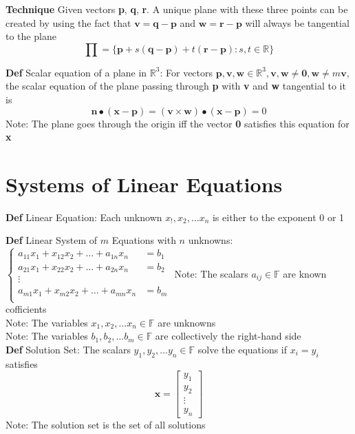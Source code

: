 \documentclass[11pt,notitlepage]{report}
\newcommand{\bb}[1]{\ensuremath{\mathbb{#1}}}
\newcommand{\tbf}[1]{\textbf{#1}}
\begin{document}
\textbf{Technique} Given vectors \tbf p, \tbf q, \tbf r. A unique plane with these three points can be created by using the fact that $\tbf v = \tbf q - \tbf p$ and $\tbf w = \tbf r - \tbf p$ will always be tangential to the plane
$$\prod = \{\tbf p + s(\tbf q - \tbf p) + t(\tbf r - \tbf p): s, t \in \bb R\}$$

\textbf{Def} Scalar equation of a plane in $\bb R^3$: For vectors $\tbf p, \tbf v, \tbf w \in \bb R^3, \tbf v, \tbf w \ne \tbf 0, \tbf w \ne m\tbf v$, the scalar equation of the plane passing through \tbf p with \tbf v and \tbf w tangential to it is
$$\tbf n \bullet (\tbf x - \tbf p) = (\tbf v \times \tbf w) \bullet (\tbf x - \tbf p) = 0$$
\hspace*{5mm} Note: The plane goes through the origin iff the vector \tbf 0 satisfies this equation for \tbf x


\section{Systems of Linear Equations}

\textbf{Def} Linear Equation: Each unknown $x_!, x_2, \dots x_n$ is either to the exponent 0 or 1

\textbf{Def} Linear System of $m$ Equations with $n$ unknowns: 
$\begin{cases}
a_{11}x_1 + x_{12}x_2 + \dots + a_{1n}x_n &= b_1\\
a_{21}x_1 + x_{22}x_2 + \dots + a_{2n}x_n &= b_2\\
\vdots\\
a_{m1}x_1 + x_{m2}x_2 + \dots + a_{mn}x_n &= b_m\\
\end{cases}$
\hspace*{5mm} Note: The scalars $a_{ij} \in \bb F$ are known cofficients\\
\hspace*{5mm} Note: The variables $x_1, x_2, \dots x_{n} \in \bb F$ are unknowns\\
\hspace*{5mm} Note: The variables $b_1, b_2, \dots b_{m} \in \bb F$ are collectively the right-hand side\\

\textbf{Def} Solution Set: The scalars $y_1, y_2, \dots y_{n} \in \bb F$ solve the equations if $x_i = y_i$ satisfies\\
$$\tbf x = \begin{bmatrix}
y_1\\y_2\\ \vdots\\y_n
\end{bmatrix}$$
\hspace*{5mm} Note: The solution set is the set of all solutions
\end{document}
